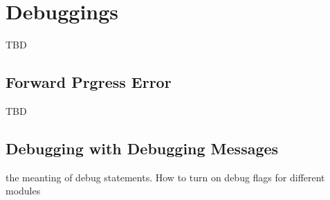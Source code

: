 
\clearpage
\section{Debuggings}
\label{sec:debugging}
TBD 
\subsection{Forward Prgress Error}
TBD 
\subsection{Debugging with Debugging Messages}
the meanting of debug statements. 
How to turn on debug flags for different modules


